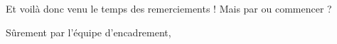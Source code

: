 

\huge
{}

\bigskip

\normalsize
Et voilà donc venu le temps des remerciements ! Mais par ou commencer ? 

\medskip

Sûrement par l'équipe d'encadrement, 
